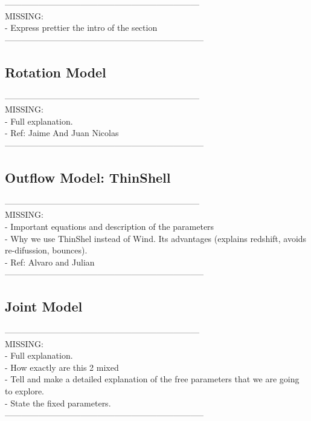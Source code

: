 \documentclass{emulateapj}
\begin{document}
---------------------------------------------------------------------\\
MISSING: \\
- Express prettier the intro of the section\\
-----------------------------------------------------------------------\\


\subsection{Rotation Model}
---------------------------------------------------------------------\\
MISSING: \\
- Full explanation.\\
- Ref: Jaime And Juan Nicolas\\
-----------------------------------------------------------------------\\


\subsection{Outflow Model: ThinShell}

---------------------------------------------------------------------\\
MISSING:\\
- Important equations and description of the parameters\\
- Why we use ThinShel instead of Wind. Its advantages (explains redshift, avoids re-difussion, bounces).\\
- Ref: Alvaro and Julian\\
-----------------------------------------------------------------------\\

\subsection{Joint Model}

---------------------------------------------------------------------\\
MISSING: \\
- Full explanation.\\
- How exactly are this 2 mixed\\
- Tell and make a detailed explanation of the free parameters that we are going to explore. \\
- State the fixed parameters.\\
-----------------------------------------------------------------------\\
\end{document}
